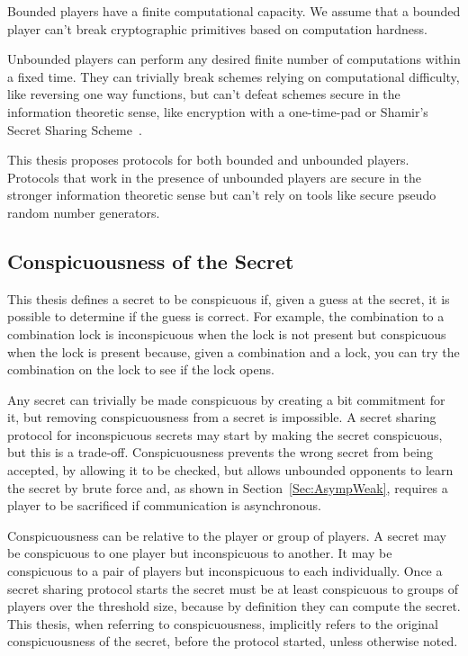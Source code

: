 \documentclass{dalcsthesis}
\begin{document}
Bounded players have a finite computational capacity. We assume that a bounded player can't break cryptographic primitives based on computation hardness.

Unbounded players can perform any desired finite number of computations within a fixed time. They can trivially break schemes relying on computational difficulty, like reversing one way functions, but can't defeat schemes secure in the information theoretic sense, like encryption with a one-time-pad or Shamir's Secret Sharing Scheme~\cite{shamir79}.

This thesis proposes protocols for both bounded and unbounded players. Protocols that work in the presence of unbounded players are secure in the stronger information theoretic sense but can't rely on tools like secure pseudo random number generators.

\subsection{Conspicuousness of the Secret} 

This thesis defines a secret to be conspicuous if, given a guess at the secret, it is possible to determine if the guess is correct. For example, the combination to a combination lock is inconspicuous when the lock is not present but conspicuous when the lock is present because, given a combination and a lock, you can try the combination on the lock to see if the lock opens.

Any secret can trivially be made conspicuous by creating a bit commitment for it, but removing conspicuousness from a secret is impossible. A secret sharing protocol for inconspicuous secrets may start by making the secret conspicuous, but this is a trade-off. Conspicuousness prevents the wrong secret from being accepted, by allowing it to be checked, but allows unbounded opponents to learn the secret by brute force and, as shown in Section~\ref{Sec:AsympWeak}, requires a player to be sacrificed if communication is asynchronous.

Conspicuousness can be relative to the player or group of players. A secret may be conspicuous to one player but inconspicuous to another. It may be conspicuous to a pair of players but inconspicuous to each individually. Once a secret sharing protocol starts the secret must be at least conspicuous to groups of players over the threshold size, because by definition they can compute the secret. This thesis, when referring to conspicuousness, implicitly refers to the original conspicuousness of the secret, before the protocol started, unless otherwise noted.
\end{document}
